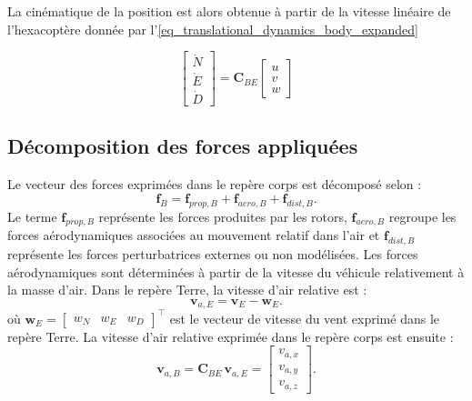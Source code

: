 \documentclass[11pt,a4paper,oneside]{report}
\begin{document}
	
	La cinématique de la position est alors obtenue à partir de la vitesse linéaire de l'hexacoptère donnée par l'\cref{eq_translational_dynamics_body_expanded} 
	
	
	\begin{equation}
		\begin{bmatrix}
			\dot{N}\\
			\dot{E}\\
			\dot{D}
		\end{bmatrix}
		=
		\mathbf{C}_{BE}
		\begin{bmatrix}
			u\\
			v\\
			w
		\end{bmatrix}
	\end{equation}
	
	
	
	
	\subsection{Décomposition des forces appliquées}
	Le vecteur des forces exprimées dans le repère corps est décomposé selon :
	\begin{equation}
		\mathbf{f}_B=\mathbf{f}_{prop,B}+\mathbf{f}_{aero,B}+\mathbf{f}_{dist,B}.
		\label{eq_force_decomposition}
	\end{equation}
	Le terme \(\mathbf{f}_{prop,B}\) représente les forces produites par les rotors, \(\mathbf{f}_{aero,B}\) regroupe les forces aérodynamiques associées au mouvement relatif dans l'air et \(\mathbf{f}_{dist,B}\) représente les forces perturbatrices externes ou non modélisées.
	Les forces aérodynamiques sont déterminées à partir de la vitesse du véhicule relativement à la masse d'air. Dans le repère Terre, la vitesse d'air relative est :
	\begin{equation}
		\mathbf{v}_{a,E}=\mathbf{v}_E-\mathbf{w}_E.
		\label{eq_relative_air_velocity_earth}
	\end{equation}
	où \(\mathbf{w}_E=\begin{bmatrix}w_N&w_E&w_D\end{bmatrix}^{\top}\) est le vecteur de vitesse du vent exprimé dans le repère Terre. La vitesse d'air relative exprimée dans le repère corps est ensuite :
	\begin{equation}
		\mathbf{v}_{a,B}=\mathbf{C}_{BE}\,\mathbf{v}_{a,E}=
		\begin{bmatrix}
			v_{a,x}\\
			v_{a,y}\\
			v_{a,z}
		\end{bmatrix}.
		\label{eq_relative_air_velocity_body}
	\end{equation}
	
\end{document}
